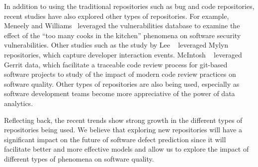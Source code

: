 



In addition to using the traditional repositories such as bug and code repositories, recent studies have also explored other types of repositories. For example, Meneely and Williams~\cite{Meneely2010ESEM} leveraged the vulnerabilities database to examine the effect of the ``too many cooks in the kitchen'' phenomena on software security vulnerabilities. Other studies such as the study by Lee \ea ~\cite{Lee2011FSE} leveraged Mylyn repositories, which capture developer interaction events. McIntosh \ea ~\cite{McIntosh2014MSR} leveraged Gerrit data, which facilitate a traceable code review process for git-based software projects to study of the impact of modern code review practices on software quality. Other types of repositories are also being used, especially as software development teams become more appreciative of the power of data analytics.

Reflecting back, the recent trends show strong growth in the different types of repositories being used. We believe that exploring new repositories will have a significant impact on the future of software defect prediction since it will facilitate better and more effective models and allow us to explore the impact of different types of phenomena on software quality.





